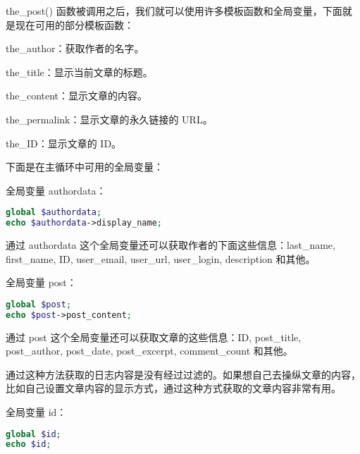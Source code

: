 the\_post() 函数被调用之后，我们就可以使用许多模板函数和全局变量，下面就是现在可用的部分模板函数：

\begin{compactitem}
\item the\_author：获取作者的名字。
\item the\_title：显示当前文章的标题。
\item the\_content：显示文章的内容。
\item the\_permalink：显示文章的永久链接的 URL。
\item the\_ID：显示文章的 ID。
\end{compactitem}


下面是在主循环中可用的全局变量：

\begin{compactitem}
\item 全局变量 authordata：
\end{compactitem}

\begin{lstlisting}[language=PHP]
global $authordata;
echo $authordata->display_name;
\end{lstlisting}

通过 authordata 这个全局变量还可以获取作者的下面这些信息：last\_name, first\_name, ID, user\_email, user\_url, user\_login, description 和其他。

\begin{compactitem}
\item 全局变量 post：
\end{compactitem}

\begin{lstlisting}[language=PHP]
global $post;
echo $post->post_content;
\end{lstlisting}

通过 post 这个全局变量还可以获取文章的这些信息：ID, post\_title,  post\_author, post\_date, post\_excerpt, comment\_count 和其他。

通过这种方法获取的日志内容是没有经过过滤的。如果想自己去操纵文章的内容，比如自己设置文章内容的显示方式，通过这种方式获取的文章内容非常有用。

\begin{compactitem}
\item 全局变量 id：
\end{compactitem}

\begin{lstlisting}[language=PHP]
global $id;
echo $id;
\end{lstlisting}


